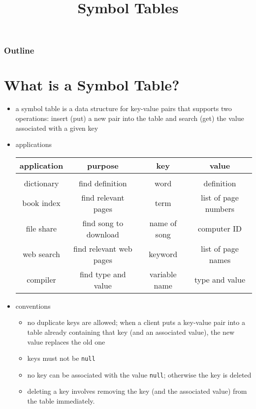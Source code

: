 \documentclass[8pt,a4paper,compress]{beamer}
\title{Symbol Tables}
\date{}
\begin{document}
\begin{frame}
\vfill
\titlepage
\end{frame}

\begin{frame}
\frametitle{Outline}
\tableofcontents
\end{frame}

\section{What is a Symbol Table?}
\begin{frame}[fragile]
\begin{itemize}
\item a symbol table is a data structure for key-value pairs that supports two operations: insert (put) a new pair into the table and search (get) the value associated with a given key

\item applications 
\begin{center}
\begin{tabular}{cccc}
\textbf{application} & \textbf{purpose} & \textbf{key} & \textbf{value} \\ \hline \\
dictionary & find definition & word & definition \\
book index & find relevant pages & term & list of page numbers \\
file share & find song to download & name of song & computer ID \\
web search & find relevant web pages & keyword & list of page names \\
compiler & find type and value & variable name & type and value \\
\end{tabular} 
\end{center}

\item conventions
\begin{itemize}
\item no duplicate keys are allowed; when a client puts a key-value pair into a table already containing that key (and an associated value), the new value replaces the old one

\item keys must not be \lstinline{null}

\item no key can be associated with the value \lstinline{null}; otherwise the key is deleted

\item deleting a key involves removing the key (and the associated value) from the table immediately.
\end{itemize}
\end{itemize}
\end{frame}
\end{document}
